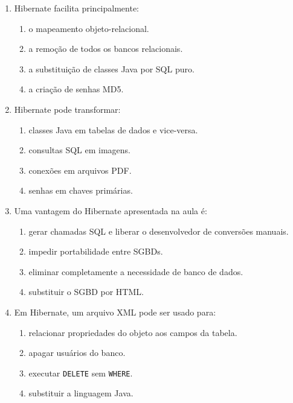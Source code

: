 \documentclass[12pt,a4paper]{article}
\begin{document}
\begin{enumerate}[label=\textbf{Q\arabic*.}]
\begin{enumerate}[label=\alph*)]
    \item avançar para a próxima linha do resultado.
    \item apagar a próxima linha da tabela.
    \item fechar a conexão.
    \item criar uma nova tabela.
\end{enumerate}

\item Hibernate facilita principalmente:

\begin{enumerate}[label=\alph*)]
    \item o mapeamento objeto-relacional.
    \item a remoção de todos os bancos relacionais.
    \item a substituição de classes Java por SQL puro.
    \item a criação de senhas MD5.
\end{enumerate}

\item Hibernate pode transformar:

\begin{enumerate}[label=\alph*)]
    \item classes Java em tabelas de dados e vice-versa.
    \item consultas SQL em imagens.
    \item conexões em arquivos PDF.
    \item senhas em chaves primárias.
\end{enumerate}

\item Uma vantagem do Hibernate apresentada na aula é:

\begin{enumerate}[label=\alph*)]
    \item gerar chamadas SQL e liberar o desenvolvedor de conversões manuais.
    \item impedir portabilidade entre SGBDs.
    \item eliminar completamente a necessidade de banco de dados.
    \item substituir o SGBD por HTML.
\end{enumerate}

\item Em Hibernate, um arquivo XML pode ser usado para:

\begin{enumerate}[label=\alph*)]
    \item relacionar propriedades do objeto aos campos da tabela.
    \item apagar usuários do banco.
    \item executar \texttt{DELETE} sem \texttt{WHERE}.
    \item substituir a linguagem Java.
\end{enumerate}


\end{enumerate}
\end{document}
